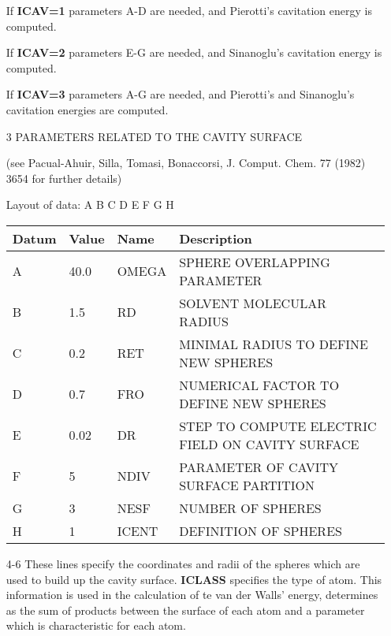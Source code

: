 \begin{enumerate}
If {\bf ICAV=1} parameters A-D are needed, and Pierotti's
cavitation energy is  computed. 

If {\bf ICAV=2} parameters E-G are needed, and Sinanoglu's
cavitation energy is  computed.  
                                                                      
If {\bf ICAV=3} parameters A-G are needed, and Pierotti's and Sinanoglu's
cavitation energies are computed.

\item[3]   PARAMETERS RELATED TO THE CAVITY SURFACE          

   (see Pacual-Ahuir, Silla, Tomasi, Bonaccorsi, J. Comput.
   Chem. 77 (1982) 3654 for further details)   
                                                                      
Layout of data: A B C D E F G H

\begin{center}\begin{tabular}{llll} 
\hline
 Datum & Value & Name   &  Description  \\ \hline
A & 40.0 &  OMEGA  &  SPHERE OVERLAPPING PARAMETER                      \\
B & 1.5  & RD     &  SOLVENT MOLECULAR RADIUS                          \\            
C & 0.2  & RET    &  MINIMAL RADIUS TO DEFINE NEW SPHERES              \\
D & 0.7  & FRO    &  NUMERICAL FACTOR TO DEFINE NEW SPHERES            \\            
E & 0.02 & DR     &  STEP TO COMPUTE ELECTRIC FIELD ON CAVITY SURFACE  \\
F &  5   & NDIV   &  PARAMETER OF CAVITY SURFACE PARTITION             \\            
G &  3   & NESF   &  NUMBER OF SPHERES                                 \\
H &  1   &  ICENT  &  DEFINITION OF SPHERES                             \\            
\hline
\end{tabular}
\end{center}
\item[4-6]  These lines specify the coordinates and radii of the spheres
which are used to build up the cavity surface.
{\bf ICLASS} specifies the type of atom.  This information is used 
in the calculation of te van der Walls' energy, determines as the sum of
products between the surface of each atom and a parameter which is 
characteristic for each atom.


\end{enumerate}
